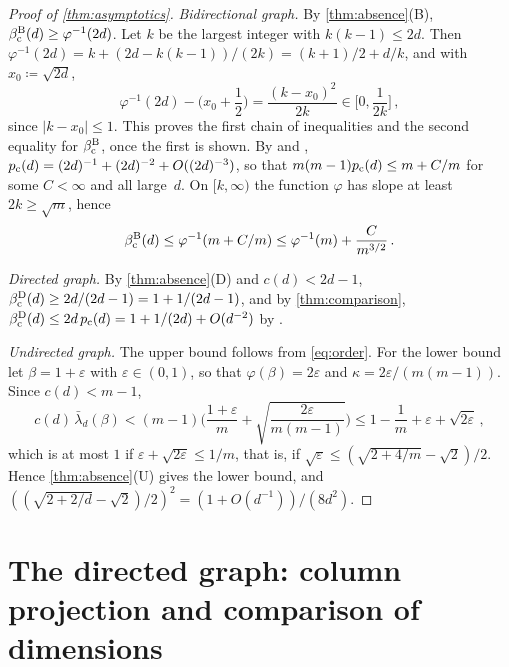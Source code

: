 \documentclass[11pt,letterpaper]{article}
\begin{document}
\begin{proof}[Proof of \cref{thm:asymptotics}]
\emph{Bidirectional graph.} By \cref{thm:absence}(B), $\beta_{\mathrm c}^{\mathrm B}(d)\ge\varphi^{-1}(2d)$. Let $k$ be the largest integer with $k(k-1)\le2d$. Then $\varphi^{-1}(2d)=k+(2d-k(k-1))/(2k)=(k+1)/2+d/k$, and with $x_0\coloneqq\sqrt{2d}$,
\begin{equation*}
\varphi^{-1}(2d)-\Big(x_0+\frac12\Big)=\frac{(k-x_0)^2}{2k}\in\Big[0,\frac{1}{2k}\Big]\,,
\end{equation*}
since $|k-x_0|\le1$. This proves the first chain of inequalities and the second equality for $\beta_{\mathrm c}^{\mathrm B}$, once the first is shown. By \cite{HS95} and \cite[Theorem~1.1]{vdHS06}, $p_{\mathrm c}(d)=(2d)^{-1}+(2d)^{-2}+O((2d)^{-3})$, so that $m(m-1)p_{\mathrm c}(d)\le m+C/m$ for some $C<\infty$ and all large~$d$. On $[k,\infty)$ the function $\varphi$ has slope at least $2k\ge\sqrt{m}$, hence
\begin{equation*}
\beta_{\mathrm c}^{\mathrm B}(d)\le\varphi^{-1}(m+C/m)\le\varphi^{-1}(m)+\frac{C}{m^{3/2}}\,.
\end{equation*}

\emph{Directed graph.} By \cref{thm:absence}(D) and $c(d)<2d-1$, $\beta_{\mathrm c}^{\mathrm D}(d)\ge2d/(2d-1)=1+1/(2d-1)$, and by \cref{thm:comparison}, $\beta_{\mathrm c}^{\mathrm D}(d)\le2d\,p_{\mathrm c}(d)=1+1/(2d)+O(d^{-2})$ by \cite{HS95}.

\emph{Undirected graph.} The upper bound follows from \eqref{eq:order}. For the lower bound let $\beta=1+\varepsilon$ with $\varepsilon\in(0,1)$, so that $\varphi(\beta)=2\varepsilon$ and $\kappa=2\varepsilon/(m(m-1))$. Since $c(d)<m-1$,
\begin{equation*}
c(d)\,\bar\lambda_d(\beta)<(m-1)\Big(\frac{1+\varepsilon}m+\sqrt{\frac{2\varepsilon}{m(m-1)}}\Big)\le1-\frac1m+\varepsilon+\sqrt{2\varepsilon}\,,
\end{equation*}
which is at most $1$ if $\varepsilon+\sqrt{2\varepsilon}\le1/m$, that is, if $\sqrt\varepsilon\le(\sqrt{2+4/m}-\sqrt2)/2$. Hence \cref{thm:absence}(U) gives the lower bound, and $((\sqrt{2+2/d}-\sqrt2)/2)^2=(1+O(d^{-1}))/(8d^2)$.
\end{proof}



\section{The directed graph: column projection and comparison of dimensions}\label{sec:column}
\end{document}
